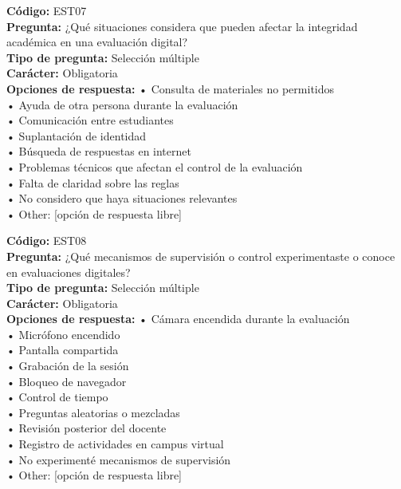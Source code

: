 \begin{infobox}\small
\textbf{\textcolor{accent}{Código:}} EST07\\
\textbf{\textcolor{accent}{Pregunta:}} ¿Qué situaciones considera que pueden afectar la integridad académica en una evaluación digital?\\
\textbf{\textcolor{accent}{Tipo de pregunta:}} Selección múltiple\\
\textbf{\textcolor{accent}{Carácter:}} Obligatoria\\
\textbf{\textcolor{accent}{Opciones de respuesta:}} • Consulta de materiales no permitidos \\ • Ayuda de otra persona durante la evaluación \\ • Comunicación entre estudiantes \\ • Suplantación de identidad \\ • Búsqueda de respuestas en internet \\ • Problemas técnicos que afectan el control de la evaluación \\ • Falta de claridad sobre las reglas \\ • No considero que haya situaciones relevantes \\ • Other: [opción de respuesta libre]\\
\end{infobox}
\begin{infobox}\small
\textbf{\textcolor{accent}{Código:}} EST08\\
\textbf{\textcolor{accent}{Pregunta:}} ¿Qué mecanismos de supervisión o control experimentaste o conoce en evaluaciones digitales?\\
\textbf{\textcolor{accent}{Tipo de pregunta:}} Selección múltiple\\
\textbf{\textcolor{accent}{Carácter:}} Obligatoria\\
\textbf{\textcolor{accent}{Opciones de respuesta:}} • Cámara encendida durante la evaluación \\ • Micrófono encendido \\ • Pantalla compartida \\ • Grabación de la sesión \\ • Bloqueo de navegador \\ • Control de tiempo \\ • Preguntas aleatorias o mezcladas \\ • Revisión posterior del docente \\ • Registro de actividades en campus virtual \\ • No experimenté mecanismos de supervisión \\ • Other: [opción de respuesta libre]\\
\end{infobox}
